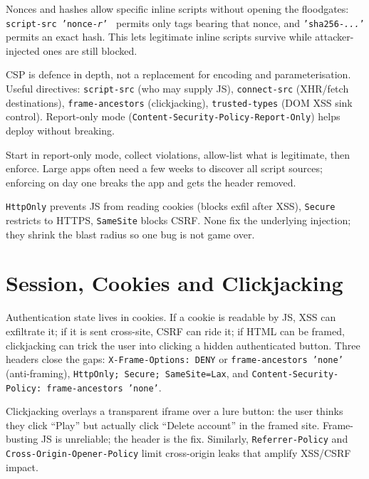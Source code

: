 Nonces and hashes allow specific inline scripts without opening the floodgates: \texttt{script-src 'nonce-\textit{r}' } permits only tags bearing that nonce, and \texttt{'sha256-\textit{...}'} permits an exact hash. This lets legitimate inline scripts survive while attacker-injected ones are still blocked.

CSP is defence in depth, not a replacement for encoding and parameterisation. Useful directives: \texttt{script-src} (who may supply JS), \texttt{connect-src} (XHR/fetch destinations), \texttt{frame-ancestors} (clickjacking), \texttt{trusted-types} (DOM XSS sink control). Report-only mode (\texttt{Content-Security-Policy-Report-Only}) helps deploy without breaking.

\begin{remark}
Start in report-only mode, collect violations, allow-list what is legitimate, then enforce. Large apps often need a few weeks to discover all script sources; enforcing on day one breaks the app and gets the header removed.
\end{remark}

\begin{remark}
\texttt{HttpOnly} prevents JS from reading cookies (blocks exfil after XSS), \texttt{Secure} restricts to HTTPS, \texttt{SameSite} blocks CSRF. None fix the underlying injection; they shrink the blast radius so one bug is not game over.
\end{remark}

\section{Session, Cookies and Clickjacking}
\label{sec:session}
Authentication state lives in cookies. If a cookie is readable by JS, XSS can exfiltrate it; if it is sent cross-site, CSRF can ride it; if HTML can be framed, clickjacking can trick the user into clicking a hidden authenticated button. Three headers close the gaps: \texttt{X-Frame-Options: DENY} or \texttt{frame-ancestors 'none'} (anti-framing), \texttt{HttpOnly; Secure; SameSite=Lax}, and \texttt{Content-Security-Policy: frame-ancestors 'none'}.

Clickjacking overlays a transparent iframe over a lure button: the user thinks they click ``Play'' but actually click ``Delete account'' in the framed site. Frame-busting JS is unreliable; the header is the fix. Similarly, \texttt{Referrer-Policy} and \texttt{Cross-Origin-Opener-Policy} limit cross-origin leaks that amplify XSS/CSRF impact.

